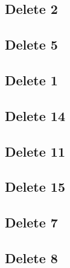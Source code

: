 \documentclass{article}
\begin{document}
\subsection*{Delete 2}
\subsection*{Delete 5}
\subsection*{Delete 1}
\subsection*{Delete 14}
\subsection*{Delete 11}
\subsection*{Delete 15}
\subsection*{Delete 7}
\subsection*{Delete 8}
\end{document}
